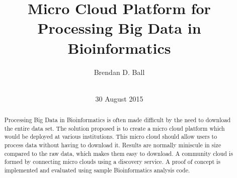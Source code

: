 \documentclass{sig-alternate-05-2015}
\begin{document}


\title{Micro Cloud Platform for Processing Big Data in Bioinformatics}

\author{
\alignauthor
Brendan D. Ball\\
       \\
}

\date{30 August 2015}


\maketitle
\begin{abstract}
Processing Big Data in Bioinformatics is often made difficult by the need to download the entire data set. The solution proposed is to create a micro cloud platform which would be deployed at various institutions. This micro cloud should allow users to process data without having to download it. Results are normally miniscule in size compared to the raw data, which makes them easy to download. A community cloud is formed by connecting micro clouds using a discovery service. A proof of concept is implemented and evaluated using sample Bioinformatics analysis code.
\end{abstract}
\end{document}
